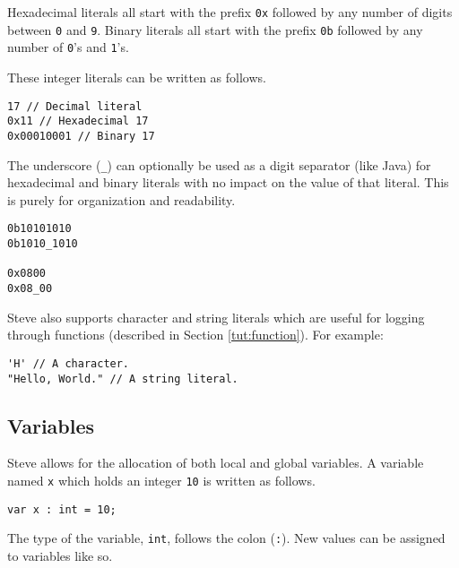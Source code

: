 Hexadecimal literals all start with the prefix \texttt{0x} followed by any
number of digits between \texttt{0} and \texttt{9}. Binary literals all start with the prefix \texttt{0b} followed by any number of
\texttt{0}'s and \texttt{1}'s.

These integer literals can be written as follows.

\begin{codepage}
\begin{lstlisting}
17 // Decimal literal
0x11 // Hexadecimal 17
0x00010001 // Binary 17
\end{lstlisting}
\end{codepage}
 
The underscore (\texttt{\_}) can optionally be used as a digit separator (like 
Java) for hexadecimal and binary literals with no impact on the value of that 
literal.
This is purely for organization and readability.

\begin{codepage}
\begin{lstlisting}
0b10101010
0b1010_1010

0x0800
0x08_00
\end{lstlisting}
\end{codepage}

Steve also supports character and string literals which are useful for
logging through functions (described in Section \ref{tut:function}).
For example:

\begin{codepage}
\begin{lstlisting}
'H' // A character.
"Hello, World." // A string literal.
\end{lstlisting}
\end{codepage}

\subsection{Variables} \label{tut:variable}

Steve allows for the allocation of both local and global variables. 
A variable named \texttt{x} which holds an integer \texttt{10} is written
as follows. 

\begin{codepage}
\begin{lstlisting}
var x : int = 10;
\end{lstlisting}
\end{codepage}

The type of the variable, \texttt{int}, follows the colon
(\texttt{:}). New values can be assigned to variables like so.

